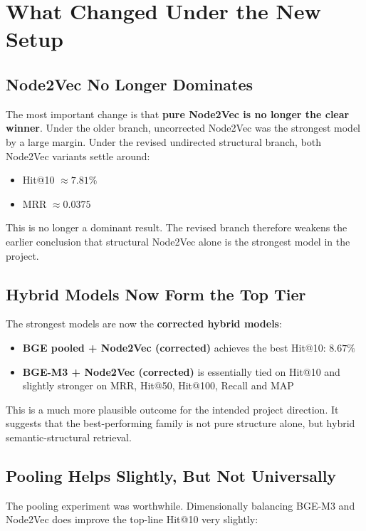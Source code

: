 \documentclass[11pt,a4paper]{article}
\begin{document}
\section{What Changed Under the New Setup}

\subsection{Node2Vec No Longer Dominates}
The most important change is that \textbf{pure Node2Vec is no longer the clear
winner}. Under the older branch, uncorrected Node2Vec was the strongest model by
a large margin. Under the revised undirected structural branch, both Node2Vec
variants settle around:

\begin{itemize}
    \item Hit@10 $\approx 7.81\%$
    \item MRR $\approx 0.0375$
\end{itemize}

This is no longer a dominant result. The revised branch therefore weakens the
earlier conclusion that structural Node2Vec alone is the strongest model in the
project.

\subsection{Hybrid Models Now Form the Top Tier}
The strongest models are now the \textbf{corrected hybrid models}:

\begin{itemize}
    \item \textbf{BGE pooled + Node2Vec (corrected)} achieves the best Hit@10:
          $8.67\%$
    \item \textbf{BGE-M3 + Node2Vec (corrected)} is essentially tied on Hit@10
          and slightly stronger on MRR, Hit@50, Hit@100, Recall and MAP
\end{itemize}

This is a much more plausible outcome for the intended project direction. It
suggests that the best-performing family is not pure structure alone, but
hybrid semantic-structural retrieval.

\subsection{Pooling Helps Slightly, But Not Universally}
The pooling experiment was worthwhile. Dimensionally balancing BGE-M3 and
Node2Vec does improve the top-line Hit@10 very slightly:
\end{document}

